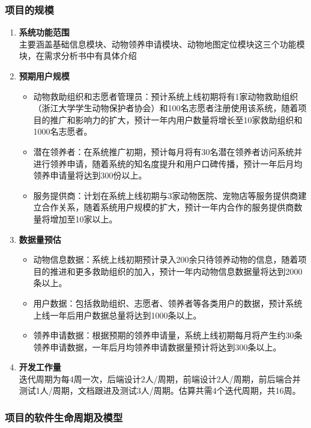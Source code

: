 \documentclass[12pt,a4paper,UTF8]{article}
\begin{document}
\subsubsection{项目的规模}

\begin{enumerate}
  \item \textbf{系统功能范围} \\
  主要涵盖基础信息模块、动物领养申请模块、动物地图定位模块这三个功能模块，在需求分析书中有具体介绍
  \item \textbf{预期用户规模} 
  \begin{itemize}
    \item 动物救助组织和志愿者管理员：预计系统上线初期将有1家动物救助组织（浙江大学学生动物保护者协会）和100名志愿者注册使用该系统，随着项目的推广和影响力的扩大，预计一年内用户数量将增长至10家救助组织和1000名志愿者。
    \item 潜在领养者：在系统推广初期，预计每月将有30名潜在领养者访问系统并进行领养申请，随着系统的知名度提升和用户口碑传播，预计一年后月均领养申请量将达到300份以上。
    \item 服务提供商：计划在系统上线初期与3家动物医院、宠物店等服务提供商建立合作关系，随着系统用户规模的扩大，预计一年内合作的服务提供商数量将增加至10家以上。
  \end{itemize}
  \item \textbf{数据量预估} 
  \begin{itemize}
    \item 动物信息数据：系统上线初期预计录入200余只待领养动物的信息，随着项目的推进和更多救助组织的加入，预计一年内动物信息数据量将达到2000条以上。
    \item 用户数据：包括救助组织、志愿者、领养者等各类用户的数据，预计系统上线一年后用户数据总量将达到1000条以上。
    \item 领养申请数据：根据预期的领养申请量，系统上线初期每月将产生约30条领养申请数据，一年后月均领养申请数据量预计将达到300条以上。
  \end{itemize}
  \item \textbf{开发工作量} \\
  迭代周期为每4周一次，后端设计2人/周期，前端设计2人/周期，前后端合并测试1人/周期，文档跟进及测试3人/周期。估算共需4个迭代周期，共16周。
\end{enumerate}

\subsubsection{项目的软件生命周期及模型}
\end{document}
